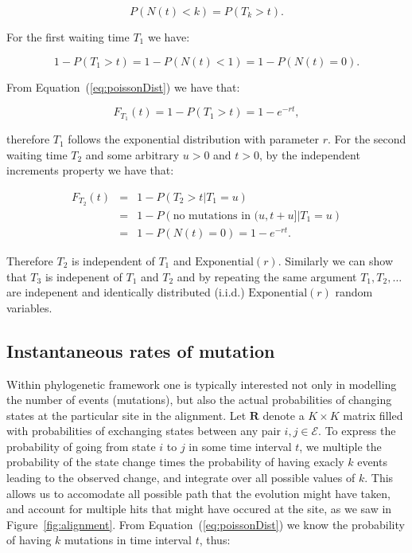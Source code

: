 \begin{equation}
P\left(N(t)<k\right)=P\left(T_{k}>t\right).
\end{equation}

\noindent
For the first waiting time $T_1$ we have:

\begin{equation}
1-P\left(T_{1}>t\right)=1-P\left(N(t)<1\right)=1-P\left(N(t)=0\right).
\end{equation}

\noindent
From Equation~(\ref{eq:poissonDist}) we have that:

\begin{equation}
F_{T_{1}}(t)=1-P\left(T_{1}>t\right)=1-e^{-r t},
\end{equation}

\noindent
therefore $T_1$ follows the exponential distribution with parameter $r$.
For the second waiting time $T_2$ and some arbitrary $u>0$ and $t>0$, by the independent increments property we have that:

\begin{eqnarray}
F_{T_{2}}(t) &=& 1-P\left(T_{2}>t|T_{1}=u\right) \\ \nonumber
& = & 1-P\left(\text{no mutations in }(u,t+u]|T_{1}=u\right) \\ \nonumber 
& = & 1-P\left(N(t)=0\right)=1-e^{-r t}.
\end{eqnarray}

\noindent
Therefore $T_2$ is independent of $T_1$ and $\text{Exponential}(r)$. 
Similarly we can show that $T_3$ is indepenent of $T_1$ and $T_2$ and by repeating the same argument $T_1,T_2,\ldots$ are indepenent and identically distributed (i.i.d.) $\text{Exponential}(r)$ random variables.


\subsection{Instantaneous rates of mutation\label{sub:rates}}

Within phylogenetic framework one is typically interested not only in modelling the number of events (mutations), but also the actual probabilities of changing states at the particular site in the alignment. 
Let $\mathbf{R}$ denote a $K \times K$ matrix filled with probabilities of exchanging states between any pair $i,j\in \mathcal{E}$.
To express the probability of going from state $i$ to $j$ in some time interval $t$, we multiple the probability of the state change times the probability of having exacly $k$ events leading to the observed change, and integrate over all possible values of $k$.
This allows us to accomodate all possible path that the evolution might have taken, and account for multiple hits that might have occured at the site, as we saw in Figure~\ref{fig:alignment}.
From Equation~(\ref{eq:poissonDist}) we know the probability of having $k$ mutations in time interval $t$, thus:

